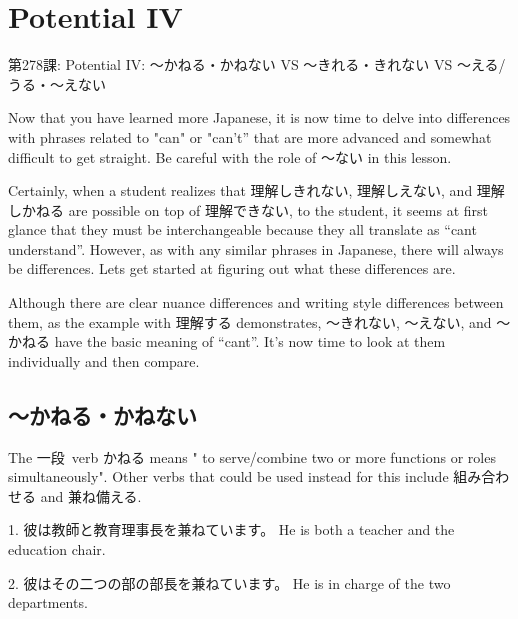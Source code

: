     
\chapter{Potential IV}

\begin{center}
\begin{Large}
第278課: Potential IV: ～かねる・かねない VS ～きれる・きれない VS ～える\slash うる・～えない 
\end{Large}
\end{center}
 
\par{ Now that you have learned more Japanese, it is now time to delve into differences with phrases related to "can" or "can't” that are more advanced and somewhat difficult to get straight. Be careful with the role of ～ない in this lesson. }

\par{  Certainly, when a student realizes that 理解しきれない, 理解しえない, and 理解しかねる are possible on top of 理解できない, to the student, it seems at first glance that they must be interchangeable because they all translate as “can\textquotesingle t understand”. However, as with any similar phrases in Japanese, there will always be differences. Let\textquotesingle s get started at figuring out what these differences are. }
 
\par{ Although there are clear nuance differences and writing style differences between them, as the example with 理解する demonstrates, ～きれない, ～えない, and ～かねる have the basic meaning of “can\textquotesingle t”. It's now time to look at them individually and then compare. }
      
\section{～かねる・かねない}
 
\par{ The 一段 verb かねる means " \textbf{ }to serve\slash combine two or more functions or roles simultaneously". Other verbs that could be used instead for this include 組み合わせる and 兼ね備える. }

\par{1. 彼は教師と教育理事長を兼ねています。 \hfill\break
He is both a teacher and the education chair. }

\par{2. 彼はその二つの部の部長を兼ねています。 \hfill\break
He is in charge of the two departments. }

